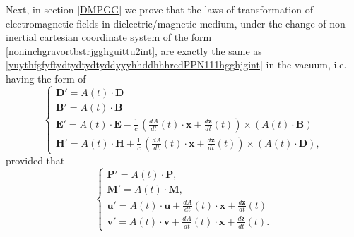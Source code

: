 \documentclass{article}
\theoremstyle{definition}
\theoremstyle{remark}
\renewcommand{\vec}[1]{\mathbf{#1}}
\newcommand{\er}{\eqref}
\newcommand{\er}{\eqref}
\begin{document}
Next,
in section \ref{DMPGG} we prove that the laws of transformation of
electromagnetic fields in dielectric/magnetic medium, under the
change of non-inertial cartesian coordinate system of the form
\er{noninchgravortbstrjgghguittu2int}, are exactly the same as
\er{yuythfgfyftydtydtydtyddyyyhhddhhhredPPN111hgghjgint} in the
vacuum, i.e. having the form of
\begin{equation}\label{guigikvbvbggjklhjkkgjgGGGGint}
\begin{cases}
\vec D'=A(t)\cdot \vec D\\
\vec B'=A(t)\cdot\vec B\\
\vec E'=A(t)\cdot\vec E-\frac{1}{c}\,\left(\frac{dA}{dt}(t)\cdot\vec
x+\frac{d\vec
z}{dt}(t)\right)\times \left(A(t)\cdot\vec B\right)\\
\vec H'=A(t)\cdot\vec H+\frac{1}{c}\,\left(\frac{dA}{dt}(t)\cdot\vec
x+\frac{d\vec z}{dt}(t)\right)\times \left(A(t)\cdot\vec D\right),
\end{cases}
\end{equation}
provided that
\begin{equation}\label{guigikvbvbGGint}
\begin{cases}
\vec P'=A(t)\cdot\vec P,\\
\vec M'=A(t)\cdot\vec M,\\
\vec u'=A(t)\cdot \vec u+\frac{dA}{dt}(t)\cdot\vec x+\frac{d\vec z}{dt}(t)\\
\vec v'=A(t)\cdot \vec v+\frac{dA}{dt}(t)\cdot\vec x+\frac{d\vec
z}{dt}(t).
\end{cases}
\end{equation}
\end{document}
